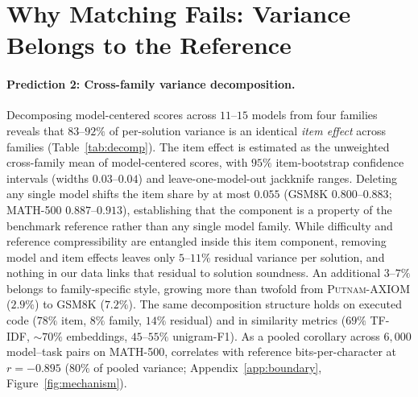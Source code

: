 \section{Why Matching Fails: Variance Belongs to the Reference}
\label{sec:mechanism}

\paragraph{Prediction 2: Cross-family variance decomposition.}
Decomposing model-centered \tfa{} scores across $11$--$15$ models from four families reveals that $83$--$92\%$ of per-solution variance is an identical \emph{item effect} across families (Table~\ref{tab:decomp}).
The item effect is estimated as the unweighted cross-family mean of model-centered \tfa{} scores, with $95\%$ item-bootstrap confidence intervals (widths $0.03$--$0.04$) and leave-one-model-out jackknife ranges.
Deleting any single model shifts the item share by at most $0.055$ (\textsc{GSM8K} $0.800$--$0.883$; \textsc{MATH-500} $0.887$--$0.913$), establishing that the component is a property of the benchmark reference rather than any single model family.
While difficulty and reference compressibility are entangled inside this item component, removing model and item effects leaves only $5$--$11\%$ residual variance per solution, and nothing in our data links that residual to solution soundness.
An additional $3$--$7\%$ belongs to family-specific style, growing more than twofold from \textsc{Putnam-AXIOM} ($2.9\%$) to \textsc{GSM8K} ($7.2\%$).
The same decomposition structure holds on executed code ($78\%$ item, $8\%$ family, $14\%$ residual) and in similarity metrics ($69\%$ TF-IDF, $\sim 70\%$ embeddings, $45$--$55\%$ unigram-F1).
As a pooled corollary across $6{,}000$ model--task pairs on \textsc{MATH-500}, \tfa{} correlates with reference bits-per-character at $r = -0.895$ ($80\%$ of pooled variance; Appendix~\ref{app:boundary}, Figure~\ref{fig:mechanism}).

